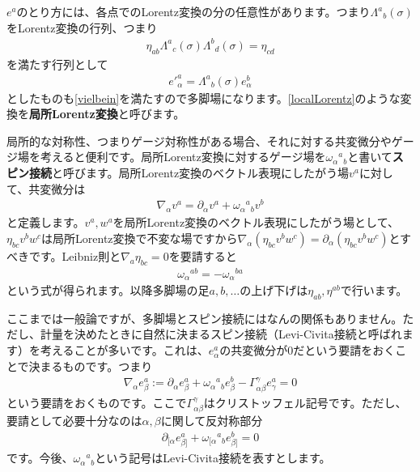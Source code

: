 \documentclass[report,paper=a4, fontsize=12pt, line_length=16cm, number_of_lines=34,dvipdfmx]{jlreq}
\numberwithin{equation}{chapter}
\numberwithin{equation}{section}
\newcommand{\del}{\partial}
\newcommand{\kyou}[1]{{\sffamily \bfseries #1}}
\begin{document}
$e^{a}$のとり方には、各点でのLorentz変換の分の任意性があります。つまり$\Lambda^{a}{}_{b}(\sigma)$をLorentz変換の行列、つまり
\begin{align}
  \eta_{ab}\Lambda^{a}{}_{c}(\sigma)\Lambda^{b}{}_{d}(\sigma)=\eta_{cd}
\end{align}
を満たす行列として
\begin{align}
  e'^{a}_{\alpha}=\Lambda^{a}{}_{b}(\sigma)e^{b}_{\alpha}
  \label{localLorentz}
\end{align}
としたものも\eqref{vielbein}を満たすので多脚場になります。\eqref{localLorentz}のような変換を\kyou{局所Lorentz変換}と呼びます。

局所的な対称性、つまりゲージ対称性がある場合、それに対する共変微分やゲージ場を考えると便利です。局所Lorentz変換に対するゲージ場を$\omega_{\alpha}{}^{a}{}_{b}$と書いて\kyou{スピン接続}と呼びます。局所Lorentz変換のベクトル表現にしたがう場$v^{a}$に対して、共変微分は
\begin{align}
  \nabla_{\alpha}v^{a}=\del_{\alpha}v^{a}+\omega_{\alpha}{}^{a}{}_{b}v^{b}
\end{align}
と定義します。$v^{a},w^{a}$を局所Lorentz変換のベクトル表現にしたがう場として、$\eta_{bc}v^{b}w^{c}$は局所Lorentz変換で不変な場ですから$\nabla_{\alpha}(\eta_{bc}v^{b}w^{c})=\del_{\alpha}(\eta_{bc}v^{b}w^{c})$とすべきです。Leibniz則と$\nabla_{a}\eta_{bc}=0$を要請すると
\begin{align}
  \omega_{\alpha}{}^{ab}
  =-\omega_{\alpha}{}^{ba}
\end{align}
という式が得られます。以降多脚場の足$a,b,\dots$の上げ下げは$\eta_{ab},\eta^{ab}$で行います。

ここまでは一般論ですが、多脚場とスピン接続にはなんの関係もありません。ただし、計量を決めたときに自然に決まるスピン接続（Levi-Civita接続と呼ばれます）を考えることが多いです。これは、$e^{a}_{\alpha}$の共変微分が$0$だという要請をおくことで決まるものです。つまり
\begin{align}
  \nabla_{\alpha}e^{a}_{\beta}:=\del_{\alpha}e^{a}_{\beta}+\omega_{\alpha}{}^{a}{}_{b}e^{b}_{\beta}-\Gamma^{\gamma}_{\alpha\beta}e^{a}_{\gamma}=0
\end{align}
という要請をおくものです。ここで$\Gamma^{\gamma}_{\alpha\beta}$はクリストッフェル記号です。ただし、要請として必要十分なのは$\alpha,\beta$に関して反対称部分
\begin{align}
  \del_{[\alpha}e^{a}_{\beta]}+\omega_{[\alpha}{}^{a}{}_{b}e^{b}_{\beta]}=0
\end{align}
です。今後、$\omega_{\alpha}{}^{a}{}_{b}$という記号はLevi-Civita接続を表すとします。
\end{document}
